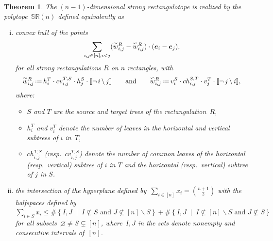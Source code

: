 \documentclass{amsart}
\newtheorem{theorem}{Theorem}%
\theoremstyle{definition}
\renewcommand{\b}[1]{{\boldsymbol{#1}}} %
\newcommand{\set}[2]{\left\{ #1 \;\middle|\; #2 \right\}} %
\newcommand{\ssm}{\smallsetminus} %
\newcommand{\eqdef}{\mbox{\,\raisebox{0.2ex}{\scriptsize\ensuremath{\mathrm:}}\ensuremath{=}\,}} %
\newcommand{\polytope}[1]{\mathds{#1}} %
\newcommand{\SRP}{\polytope{SR}} %
\newcommand{\yang}[1]{\smash{\overset{\backsim}{#1}}}
\newcommand{\yin}[1]{\smash{\overset{\sim}{#1}}}
\begin{document}
\begin{theorem}
  The $(n-1)$-dimensional strong rectangulotope is realized by the polytope~$\SRP (n)$ defined equivalently as
  \begin{enumerate}[(i)]
  \item convex hull of the points
  \[
  \sum_{i,j\in [n], i< j} (\yin{w}^R_{i,j} - \yang{w}^R_{i,j})\cdot (\b{e}_i - \b{e}_j),
  \]
   for all strong rectangulations $R$ on $n$ rectangles, with
  \[
    \yin{w}^R_{i,j} \eqdef h^T_i \cdot cv^{T,S}_{i,j}\cdot h^S_ j\cdot \llbracket \neg \, i \, \backslash \, j \rrbracket
    \qquad\text{and}\qquad
    \yang{w}^R_{i,j} \eqdef v^S_i \cdot ch^{S,T}_{i,j}\cdot v^T_j \cdot \llbracket \neg \, j \, \backslash \, i \rrbracket,
  \]
 where:
  \begin{itemize}
  \item $S$ and $T$ are the source and target trees of the rectangulation~$R$,
  \item $h^T_i$ and $v^T_i$ denote the number of leaves in the horizontal and vertical subtrees of $i$ in~$T$,
  \item $ch^{T,S}_{i,j}$ (resp.~$cv^{T,S}_{i,j}$) denote the number of common leaves of the horizontal (resp.~vertical) subtree of $i$ in $T$ and the horizontal (resp.~vertical) subtree of $j$ in $S$.
  \end{itemize}
  \item the intersection of the hyperplane defined by~$\sum_{i \in [n]} x_i = \binom{n+1}{2}$ with the halfspaces defined by~$\sum_{i \in S} x_i \le \#\set{I,J}{I \not\subseteq S \text{ and } J \not\subseteq [n] \ssm S} + \#\set{I,J}{I \not\subseteq [n] \ssm S \text{ and } J \not\subseteq S}$ for all subsets~$\varnothing \ne S \subsetneq [n]$, where~$I,J$ in the sets denote nonempty and consecutive intervals of~$[n]$.
  \end{enumerate}
\end{theorem}

\end{document}
